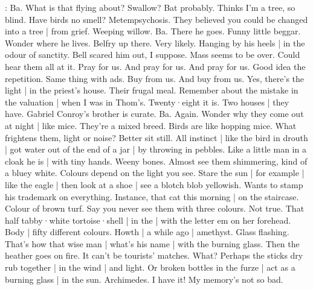 \Bloom:
Ba.
What is that flying about?
Swallow?
Bat probably.
Thinks I'm a tree,
so blind.
Have birds
no smell?
Metempsychosis.
They believed
you could be changed into a tree |
from grief.
Weeping willow.
Ba.
There he goes.
Funny little beggar.
Wonder where he lives.%
Belfry up there.
Very likely.
Hanging by his heels |
in the odour of sanctity.
Bell scared him out,
I suppose.
Mass seems to be over.
Could hear them all at it.
Pray for us.
And pray for us.
And pray for us.
Good idea the repetition.
Same thing with ads.
Buy from us.
And buy from us.
Yes,
there's the light |
in the priest's house.
Their frugal meal.
Remember about the mistake in the valuation |
when I was in Thom's.
Twenty·eight it is.
Two houses |
they have.
Gabriel Conroy's brother is curate.
Ba.
Again.
Wonder why they come out at night |
like mice.
They're a mixed breed.
Birds are
like hopping mice.
What frightens them,
light or noise?
Better sit still.
All instinct |
like the bird in drouth |
got water out of the end of a jar |
by throwing in pebbles.%
Like a little man in a cloak he is |
with tiny hands.
Weeny bones.
Almost see them shimmering,
kind of a bluey white.
Colours depend on the light you see.
Stare the sun |
for example |
like the eagle |
then look at a shoe |
see a blotch blob yellowish.
Wants to stamp his trademark on everything.
Instance,
that cat this morning |
on the staircase.
Colour of brown turf.
Say you never see them with three colours.
Not true.
That half tabby·white tortoise·shell |
in the  |
with the letter em on her forehead.
Body |
fifty different colours.
Howth |
a while ago |
amethyst.
Glass flashing.
That's how that wise man |
what's his name |
with the burning glass.
Then the heather goes on fire.
It can't be tourists' matches.
What?%
Perhaps the sticks dry rub together |
in the wind |
and light.
Or broken bottles in the furze |
act as a burning glass |
in the sun.
Archimedes.
I have it!
My memory's not so bad.

